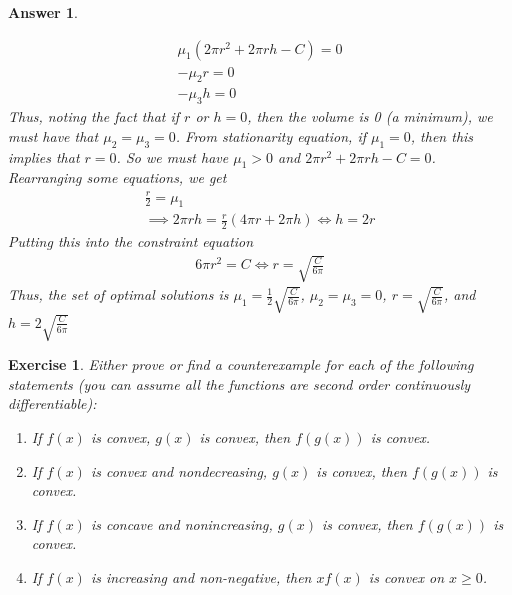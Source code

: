 \documentclass[12pt]{article}
\theoremstyle{colon}
\newtheorem{exercise}{Exercise}
\newtheorem*{answer}{Answer}
\begin{document}
\begin{answer}
\begin{enumerate}[label=\arabic*)]
      \begin{gather*}
        \mu_1(2 \pi r^2 + 2 \pi r h - C) = 0 \\
        - \mu_2 r = 0 \\
        - \mu_3 h = 0
      \end{gather*}
      Thus, noting the fact that if $r$ or $h = 0$, then the volume is 0 (a minimum), we must have that $\mu_2 = \mu_3 = 0$. From stationarity equation, if $\mu_1 = 0$, then this implies that $r = 0$. So we must have $\mu_1 > 0$ and $2 \pi r^2 + 2 \pi r h - C = 0$. Rearranging some equations, we get
      \begin{gather*}
        \frac{r}{2} = \mu_1 \\
        \implies 2 \pi r h = \frac{r}{2} \left( 4 \pi r + 2 \pi h \right) \Longleftrightarrow h = 2r
      \end{gather*}
      Putting this into the constraint equation
      \begin{gather*}
        6 \pi r^2 = C \Longleftrightarrow r = \sqrt{\frac{C}{6 \pi}}
      \end{gather*}
      Thus, the set of optimal solutions is $\mu_1 = \frac{1}{2} \sqrt{\frac{C}{6 \pi}}$, $\mu_2 = \mu_3 = 0$, $r = \sqrt{\frac{C}{6 \pi}}$, and $h = 2\sqrt{\frac{C}{6 \pi}}$
  \end{enumerate}
\end{answer}

\clearpage

\begin{exercise}
  Either prove or find a counterexample for each of the following statements (you can assume all the functions are second order continuously differentiable):
  \begin{enumerate}[label=\arabic*)]
    \item If $f(x)$ is convex, $g(x)$ is convex, then $f(g(x))$ is convex.
    \item If $f(x)$ is convex and nondecreasing, $g(x)$ is convex, then $f(g(x))$ is convex.
    \item If $f(x)$ is concave and nonincreasing, $g(x)$ is convex, then $f(g(x))$ is convex.
    \item If $f(x)$ is increasing and non-negative, then $xf(x)$ is convex on $x \geq 0$.
  \end{enumerate}
\end{exercise}
\end{document}
